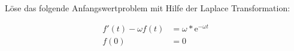 
Löse das folgende Anfangswertproblem mit Hilfe der Laplace Transformation:

\begin{align}
	f'(t)-\omega f(t)&=\omega*\text{e}^{-\omega t}\\
	f(0)&=0
\end{align}